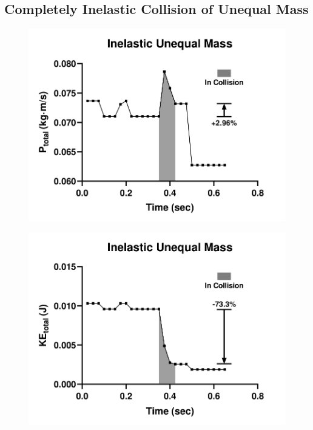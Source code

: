 \subsection{Completely Inelastic Collision of Unequal Mass}
\begin{figure}[!htb]
	\centering
	\begin{minipage}{.5\textwidth}
		\centering
		\includegraphics[width=\linewidth]{iup}
		\label{fig:test1}
	\end{minipage}%
	\begin{minipage}{.5\textwidth}
		\centering
		\includegraphics[width=\linewidth]{iuk}
		\label{fig:test2}
	\end{minipage}
\end{figure}



